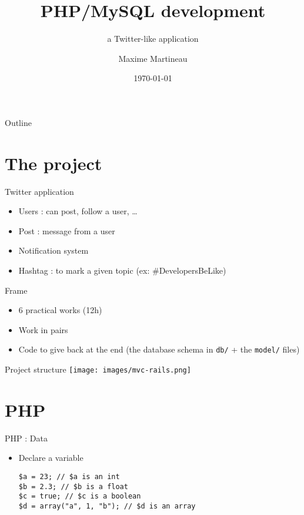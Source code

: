 \documentclass{beamer}
\title{PHP/MySQL development}
\subtitle{a Twitter-like application}
\author{Maxime Martineau}
\institute[Polytech Tours] %
{
    Polytech Tours Département Informatique  
}
\date{\today}
\begin{document}
\begin{frame}
  \titlepage
\end{frame}

\begin{frame}{Outline}
    \tableofcontents
\end{frame}

\section{The project}
\begin{frame}
    Twitter application
    
    \begin{itemize}
        \item Users : can post, follow a user, …
        \item Post : message from a user
        \item Notification system
        \item Hashtag : to mark a given topic (ex: \#DevelopersBeLike)
    \end{itemize}
\end{frame}

\begin{frame}{Frame}
\begin{itemize}
\item 6 practical works (12h)
\item Work in pairs
\item Code to give back at the end (the database schema in \texttt{db/} + the \texttt{model/} files)
\end{itemize}
\end{frame}

\begin{frame}{Project structure}
\center
\texttt{[image: images/mvc-rails.png]}
\end{frame}

\section{PHP}

\begin{frame}[fragile]{PHP : Data}
    \begin{itemize}
        \item Declare a variable
        \begin{lstlisting}
$a = 23; // $a is an int
$b = 2.3; // $b is a float
$c = true; // $c is a boolean
$d = array("a", 1, "b"); // $d is an array
        \end{lstlisting}
    \end{itemize}
\end{frame}
\end{document}
